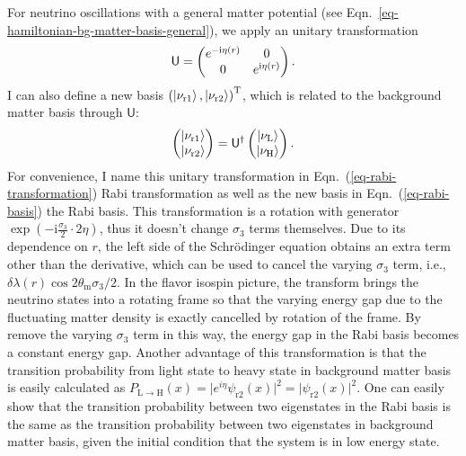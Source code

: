 For neutrino oscillations with a general matter potential (see Eqn.~\ref{eq-hamiltonian-bg-matter-basis-general}), we apply an unitary transformation
\begin{equation}
    \mathsf{U} =  \begin{pmatrix} e^{-\ri \eta (r)} & 0 \\  0 & e^{\mathrm i \eta (r)}  \end{pmatrix}.
    \label{eq-rabi-transformation}
\end{equation}
I can also define a new basis $\left(\left| \nu_{\mathrm{r1}}\right\rangle,\left| \nu_{\mathrm{r2}}\right\rangle\right)^{\mathrm{T}}$, which is related to the background matter basis through $\mathsf U$:
\begin{equation}
    \begin{pmatrix} \ket{\nu_{\mathrm{r1}}}\\ \ket{\nu_{\mathrm{r2}}} \end{pmatrix} =  \mathsf{U}^\dagger \begin{pmatrix} \ket{\nu_{\mathrm{L}}} \\ \ket{\nu_{\mathrm{H}}} \end{pmatrix}.
    \label{eq-rabi-basis}
\end{equation}
For convenience, I name this unitary transformation in Eqn.~(\ref{eq-rabi-transformation}) Rabi transformation as well as the new basis in Eqn.~(\ref{eq-rabi-basis}) the Rabi basis. This transformation is a rotation with generator $\exp\left(-\mathrm i\frac{\sigma_3}{2}\cdot 2\eta\right)$, thus it doesn't change $\sigma_3$ terms themselves. Due to its dependence on $r$, the left side of the Schr\"{o}dinger equation obtains an extra term other than the derivative, which can be used to cancel the varying $\sigma_3$ term, i.e., $\delta\lambda(r) \cos 2\theta_{\mathrm m} \sigma_3/2$. In the flavor isospin picture, the transform brings the neutrino states into a rotating frame so that the varying energy gap due to the fluctuating matter density is exactly cancelled by rotation of the frame.
By remove the varying $\sigma_3$ term in this way, the energy gap in the Rabi basis becomes a constant energy gap.
Another advantage of this transformation is that the transition probability from light state to heavy state in background matter basis is easily calculated as $P_{\mathrm{L} \to
\mathrm{H}} (x) = \lvert e^{i\eta} \psi_{\mathrm r2} (x)  \rvert^2 = \lvert \psi_{\mathrm r2} (x)  \rvert^2$. One can easily show that the transition probability between two eigenstates in the Rabi basis is the same as the transition probability between two eigenstates in background matter basis, given the initial condition that the system is in low energy state.

